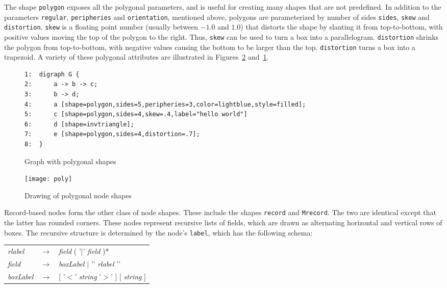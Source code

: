 \documentclass[11pt]{article}
\begin{document}
The shape {\tt polygon} exposes all the polygonal parameters, and
is useful for creating many shapes that are not predefined.
In addition to the parameters {\tt regular}, {\tt peripheries} and
{\tt orientation}, mentioned above, polygons are parameterized by 
number of sides {\tt sides}, {\tt skew} and {\tt distortion}.
{\tt skew} is a floating point number (usually between $-1.0$ and $1.0$)
that distorts the shape by slanting it from top-to-bottom,
with positive values moving the top of the polygon to the right.
Thus, {\tt skew} can be used to turn a box into a parallelogram.
{\tt distortion} shrinks the polygon from top-to-bottom, with negative
values causing the bottom to be larger than the top. {\tt distortion}
turns a box into a trapezoid. A variety of these polygonal attributes
are illustrated in Figures~\ref{fig:polygons} and~\ref{fig:polylist}.

\begin{figure}[p]\footnotesize
\begin{verbatim}
1:  digraph G {
2:      a -> b -> c;
3:      b -> d;
4:      a [shape=polygon,sides=5,peripheries=3,color=lightblue,style=filled];
5:      c [shape=polygon,sides=4,skew=.4,label="hello world"]
6:      d [shape=invtriangle];
7:      e [shape=polygon,sides=4,distortion=.7];
8:  }
\end{verbatim}
\caption{Graph with polygonal shapes}
\label{fig:polylist}
\end{figure}
\begin{figure}[p]
	\centerline {
		\texttt{[image: poly]}
	}
    \caption{Drawing of polygonal node shapes}
    \label{fig:polygons}
    \vspace*{.5in} %
\end{figure}

Record-based nodes form the other class of node shapes. 
These include the
shapes {\tt record} and {\tt Mrecord}. The two are identical
except that the latter has rounded corners. These nodes represent
recursive lists of fields, which are drawn as alternating horizontal
and vertical rows of boxes. The recursive structure is determined by
the node's {\tt label}, which has the following schema: \\
\begin{table}[h]
\begin{tabular}{lll}
{\it rlabel}  & $\rightarrow$ & {\it field} ( '$|$' {\it field} )* \\
{\it field}  & $\rightarrow$ & {\it boxLabel} $|$ '{' {\it rlabel} '}' \\
{\it boxLabel}  & $\rightarrow$ & [ '$<$' {\it string} '$>$' ] [ {\it string} ] \\
\end{tabular}
\end{table}
\end{document}
